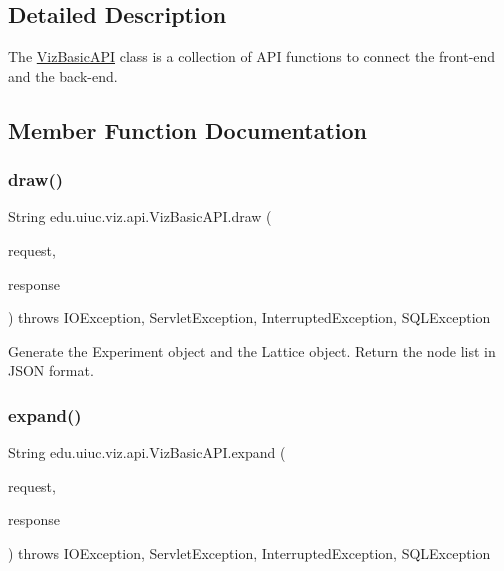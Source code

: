 \subsection{Detailed Description}
The \mbox{\hyperlink{classedu_1_1uiuc_1_1viz_1_1api_1_1_viz_basic_a_p_i}{Viz\+Basic\+A\+PI}} class is a collection of A\+PI functions to connect the front-\/end and the back-\/end. 

\subsection{Member Function Documentation}
\mbox{\label{classedu_1_1uiuc_1_1viz_1_1api_1_1_viz_basic_a_p_i_adbb1a2ed104907dc8408a9c4f9218614}} 
\subsubsection{\texorpdfstring{draw()}{draw()}}
{\footnotesize\ttfamily String edu.\+uiuc.\+viz.\+api.\+Viz\+Basic\+A\+P\+I.\+draw (\begin{DoxyParamCaption}\item[{Http\+Servlet\+Request}]{request,  }\item[{Http\+Servlet\+Response}]{response }\end{DoxyParamCaption}) throws I\+O\+Exception, Servlet\+Exception, Interrupted\+Exception, S\+Q\+L\+Exception}

Generate the Experiment object and the Lattice object. Return the node list in J\+S\+ON format. \mbox{\label{classedu_1_1uiuc_1_1viz_1_1api_1_1_viz_basic_a_p_i_ae245c3e253abd0330e8c0c4897dda1eb}} 
\subsubsection{\texorpdfstring{expand()}{expand()}}
{\footnotesize\ttfamily String edu.\+uiuc.\+viz.\+api.\+Viz\+Basic\+A\+P\+I.\+expand (\begin{DoxyParamCaption}\item[{Http\+Servlet\+Request}]{request,  }\item[{Http\+Servlet\+Response}]{response }\end{DoxyParamCaption}) throws I\+O\+Exception, Servlet\+Exception, Interrupted\+Exception, S\+Q\+L\+Exception}

